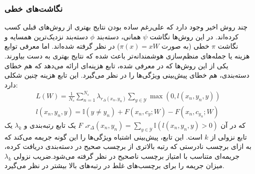 \subsubsection{نگاشت‌های خطی}\label{linear}
چند روش اخیر وجود دارد که علی‌رغم ساده بودن نتایج بهتری از روش‌های قبلی کسب کرده‌اند. در این روش‌ها  نگاشت $\psi$ همانی، دسته‌بند $\phi$ دسته‌بند نزدیک‌ترین همسایه و نگاشت $\pi$ خطی (به صورت $\pi(x) = xW$) در نظر گرفته شده‌اند. اما معرفی توابع هزینه یا جمله‌های منظم‌سازی 
هوشمندانه‌تر باعث شده که نتایج بهتری به دست بیاورند. یکی از این روش‌ها که در \cite{ akata13} معرفی شده، تابع هزینه‌ای ارائه می‌دهد که هم خطای دسته‌بندی، هم خطای پیش‌بینی ویژگی‌ها را در نظر می‌گیرد. این تابع هزینه چنین شکلی دارد:
\begin{align}
L(W) = \frac{1}{N_s} \sum_{n=1}^{N_s} \lambda_{r_\Delta (x_n, y_n)} \sum_{y \in \mathcal{Y}} \max (0, \mathit{l}(x_n, y_n, y) ) \\
\mathit{l}(x_n,y_n,y) = \mathbb{I}(y \neq y_n) + F(x_n, c_y; W) - F(x_n, c_{y_n};W)
\end{align}
که در آن 
$ r_\Delta (x_n, y_n) =  \sum_{y \in \mathcal{Y}} \mathbb{I}(\mathit{l}(x_n, y_n, y)  > 0) $،
$F$ 
یک تابع رتبه‌بندی 
 و $\lambda_k$ یک تابع نزولی از $k$ است. این تابع، پیش‌بینی اشتباه ویژگی‌ها را  این گونه جریمه می‌کند که به ازای برچسب نادرستی که رتبه بالاتری از برچسب صحیح در دسته‌بندی دریافت کرده، جریمه‌ای متناسب با امتیاز برچسب ناصحیح در نظر گرفته می‌شود.ضریب نزولی $\lambda_k$ میزان جریمه را برای برچسب‌های غلط در رتبه‌های بالا بیشتر در نظر می‌گیرد.

